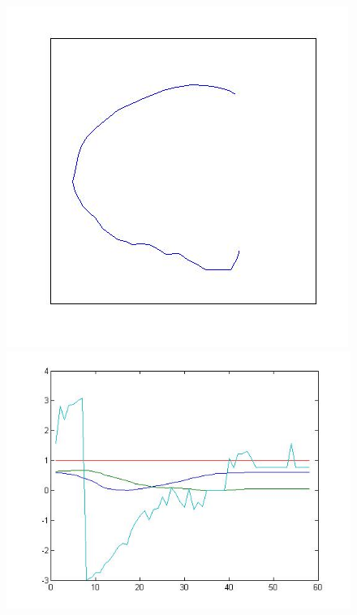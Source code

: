 \begin{figure}[H]
	\centering
	\begin{minipage}{.5\textwidth}
		\centering
		\includegraphics[width=.99\linewidth]{images/cBig}
	\end{minipage}%
	\begin{minipage}{.5\textwidth}
		\centering
		\includegraphics[width=.99\linewidth]{images/cBigPlot}
	\end{minipage}
\end{figure}
